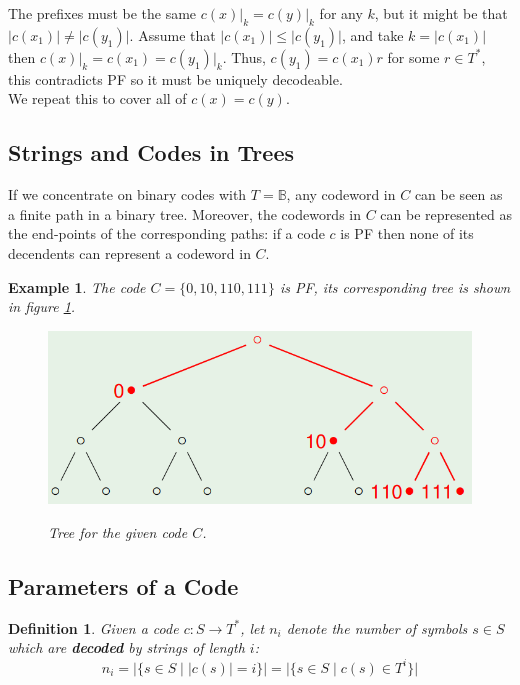 \documentclass[11pt]{article}
\newtheorem{defn}{Definition}
\newtheorem{eg}{Example}
\begin{document}
The prefixes must be the same $c(x) \rvert_{k} = c(y) \rvert_{k}$ for any $k$, but it might be that $\lvert c(x_1) \rvert \neq \lvert c(y_1) \rvert$.
Assume that $\lvert c(x_1) \rvert \leq \lvert c(y_1) \rvert$, and take $k = \lvert c(x_1) \rvert$ then $c(x) \rvert_{k} = c(x_1) = c(y_1) \rvert_{k}$.
Thus, $c(y_1) = c(x_1) r$ for some $r \in T^*$, this contradicts PF so it must be uniquely decodeable. \\

We repeat this to cover all of $c(x) = c(y)$.

\subsection{Strings and Codes in Trees}
If we concentrate on binary codes with $T = \mathbb{B}$, any codeword in $C$ can be seen as a finite path in a binary tree.
Moreover, the codewords in $C$ can be represented as the end-points of the corresponding paths: if a code $c$ is PF then none of its decendents can represent a codeword in $C$.

\begin{eg}
  The code $C = \{ 0, 10, 110, 111 \}$ is PF, its corresponding tree is shown in figure \ref{fig:treepath}.
  \begin{figure}[h!]
    \caption{Tree for the given code $C$.}
    \centering
    \includegraphics[width=\textwidth]{treepaths}
    \label{fig:treepath}
  \end{figure}
\end{eg}

\subsection{Parameters of a Code}
\begin{defn}
  Given a code $c: S \rightarrow T^*$, let $n_i$ denote the number of symbols $s \in S$ which are \textbf{decoded} by strings of length $i$:
  \[ n_i = \lvert \{ s \in S \mid \lvert c(s) \rvert = i \} \rvert = \lvert \{ s \in S \mid c(s) \in T^i \} \rvert \]
\end{defn}
\end{document}
